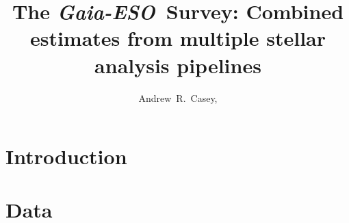 \documentclass[preprint]{aastex}
\newcommand{\project}[1]{\textsl{#1}}
\newcommand{\gaiaeso}{\project{Gaia-ESO}}
\begin{document}
\title{The \gaiaeso\ Survey: Combined estimates from multiple stellar analysis pipelines}

\author{
    Andrew~R.~Casey,
   }


\begin{abstract}
	
\end{abstract}




\section{Introduction} 
\label{sec:introduction}










\section{Data}
\label{sec:data}
\end{document}
